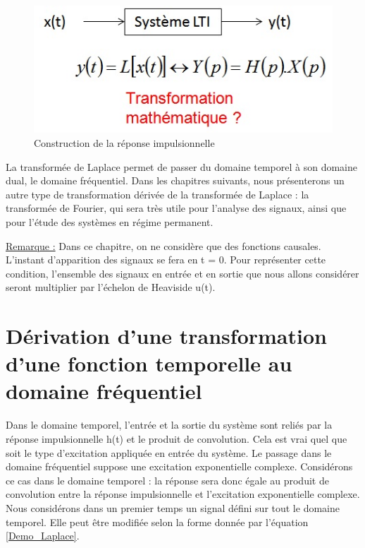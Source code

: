 \documentclass[]{book}
\begin{document}
{	\begin{figure}[h!]
		\centering
		\includegraphics[scale=0.5]{images/Position_Pb_Laplace.jpg}
		\caption{Construction de la réponse impulsionnelle}	
		\label{Fig:Position_Pb_Laplace} 
	\end{figure}
	
	 La transformée de Laplace permet de passer du domaine temporel à son domaine dual, le domaine fréquentiel. Dans les chapitres suivants, nous présenterons un autre type de transformation dérivée de la transformée de Laplace : la transformée de Fourier, qui sera très utile pour l'analyse des signaux, ainsi que pour l'étude des systèmes en régime permanent.
	
	\vspace{0.5\baselineskip}
	\underline{Remarque :}
	Dans ce chapitre, on ne considère que des fonctions causales. L'instant d'apparition des signaux se fera en t = 0. Pour représenter cette condition, l'ensemble des signaux en entrée et en sortie que nous allons considérer seront multiplier par l'échelon de Heaviside u(t).
	\vspace{1\baselineskip}
	
	\section{Dérivation d'une transformation d'une fonction temporelle au domaine fréquentiel}
	Dans le domaine temporel, l'entrée et la sortie du système sont reliés par la réponse impulsionnelle h(t) et le produit de convolution. Cela est vrai quel que soit le type d'excitation appliquée en entrée du système. Le passage dans le domaine fréquentiel suppose une excitation exponentielle complexe. Considérons ce cas dans le domaine temporel : la réponse sera donc égale au produit de convolution entre la réponse impulsionnelle et l'excitation exponentielle complexe. Nous considérons dans un premier temps un signal défini sur tout le domaine temporel. Elle peut être modifiée selon la forme donnée par l'équation \ref{Demo_Laplace}.
	
}
\end{document}
